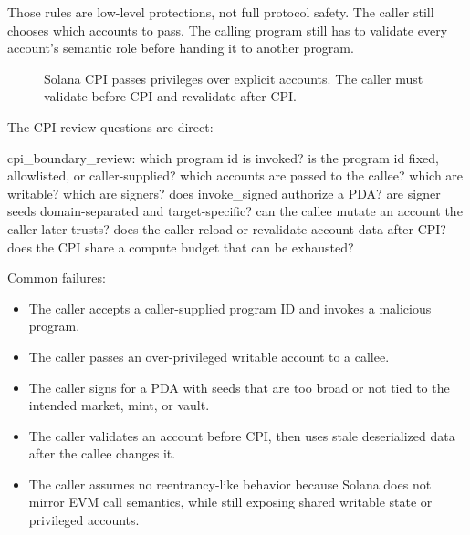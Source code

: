 Those rules are low-level protections, not full protocol safety. The caller still chooses which accounts to pass. The calling program still has to validate every account's semantic role before handing it to another program.

\begin{figure}[htbp]
\centering
{}
\caption{Solana CPI passes privileges over explicit accounts. The caller must validate before CPI and revalidate after CPI.}
\end{figure}

The CPI review questions are direct:

\begin{codeblock}
cpi_boundary_review:
    which program id is invoked?
    is the program id fixed, allowlisted, or caller-supplied?
    which accounts are passed to the callee?
    which are writable?
    which are signers?
    does invoke_signed authorize a PDA?
    are signer seeds domain-separated and target-specific?
    can the callee mutate an account the caller later trusts?
    does the caller reload or revalidate account data after CPI?
    does the CPI share a compute budget that can be exhausted?
\end{codeblock}

Common failures:

\begin{itemize}
\item The caller accepts a caller-supplied program ID and invokes a malicious program.
\item The caller passes an over-privileged writable account to a callee.
\item The caller signs for a PDA with seeds that are too broad or not tied to the intended market, mint, or vault.
\item The caller validates an account before CPI, then uses stale deserialized data after the callee changes it.
\item The caller assumes no reentrancy-like behavior because Solana does not mirror EVM call semantics, while still exposing shared writable state or privileged accounts.
\end{itemize}

